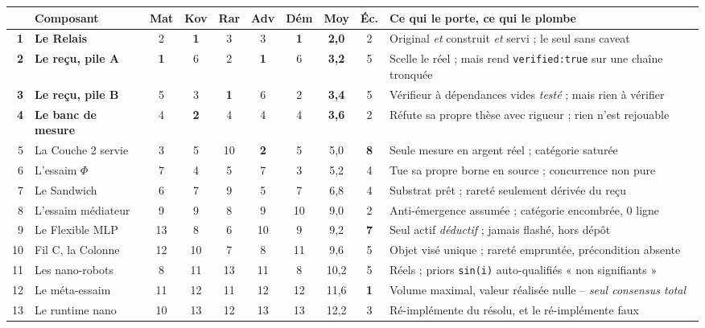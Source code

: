 \documentclass[10pt]{article}
\newcommand{\code}[1]{\texttt{\small #1}}
\newcommand{\best}[1]{{\color{green}\textbf{#1}}}
\newcommand{\sz}[1]{{\small\color{grey}\textsf{#1}}}
\begin{document}
\renewcommand{\arraystretch}{1.1}
\begin{center}\small
\begin{tabular}{@{}r>{\raggedright\arraybackslash}p{3.05cm}ccccc c c >{\raggedright\arraybackslash}p{5.5cm}@{}}
\toprule
& \textbf{Composant} & \sz{Mat} & \sz{Kov} & \sz{Rar} & \sz{Adv} & \sz{Dém} & \textbf{Moy} & \sz{Éc.} & \textbf{Ce qui le porte, ce qui le plombe} \\
\midrule
\textbf{1} & \textbf{Le Relais} & 2 & \best{1} & 3 & 3 & \best{1} & \textbf{2,0} & 2 & Original \emph{et} construit \emph{et} servi ; le seul sans caveat \\
\textbf{2} & \textbf{Le reçu, pile A} & \best{1} & 6 & 2 & \best{1} & 6 & \textbf{3,2} & 5 & Scelle le réel ; mais rend \code{verified:true} sur une chaîne tronquée \\
\textbf{3} & \textbf{Le reçu, pile B} & 5 & 3 & \best{1} & 6 & 2 & \textbf{3,4} & 5 & Vérifieur à dépendances vides \emph{testé} ; mais rien à vérifier \\
\textbf{4} & \textbf{Le banc de mesure} & 4 & \best{2} & 4 & 4 & 4 & \textbf{3,6} & 2 & Réfute sa propre thèse avec rigueur ; rien n'est rejouable \\
5 & La Couche 2 servie & 3 & 5 & 10 & \best{2} & 5 & 5,0 & \textbf{8} & Seule mesure en argent réel ; catégorie saturée \\
6 & L'essaim $\Phi$ & 7 & 4 & 5 & 7 & 3 & 5,2 & 4 & Tue sa propre borne en source ; concurrence non pure \\
7 & Le Sandwich & 6 & 7 & 9 & 5 & 7 & 6,8 & 4 & Substrat prêt ; rareté seulement dérivée du reçu \\
8 & L'essaim médiateur & 9 & 9 & 8 & 9 & 10 & 9,0 & 2 & Anti-émergence assumée ; catégorie encombrée, 0 ligne \\
9 & Le Flexible MLP & 13 & 8 & 6 & 10 & 9 & 9,2 & \textbf{7} & Seul actif \emph{déductif} ; jamais flashé, hors dépôt \\
10 & Fil C, la Colonne & 12 & 10 & 7 & 8 & 11 & 9,6 & 5 & Objet visé unique ; rareté empruntée, précondition absente \\
11 & Les nano-robots & 8 & 11 & 13 & 11 & 8 & 10,2 & 5 & Réels ; priors \code{sin(i)} auto-qualifiés « non signifiants » \\
12 & Le méta-essaim & 11 & 12 & 11 & 12 & 12 & 11,6 & \textbf{1} & Volume maximal, valeur réalisée nulle -- \emph{seul consensus total} \\
13 & Le runtime nano & 10 & 13 & 12 & 13 & 13 & 12,2 & 3 & Ré-implémente du résolu, et le ré-implémente faux \\
\bottomrule
\end{tabular}
\end{center}
\end{document}
